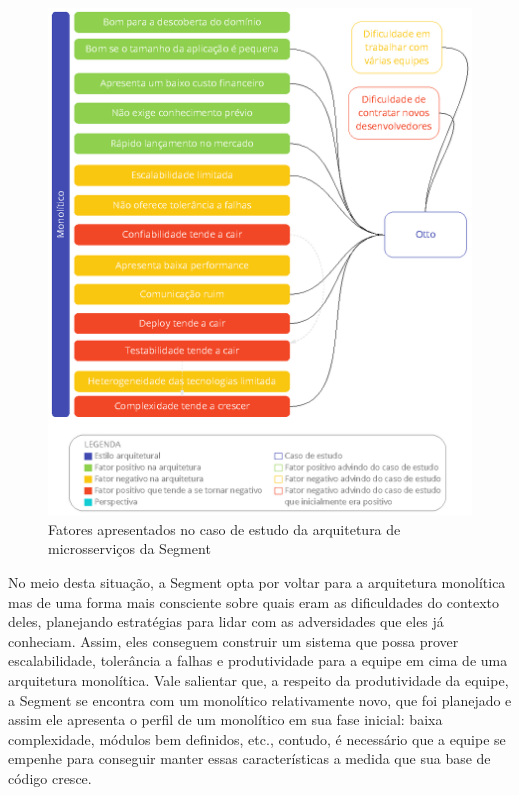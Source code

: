 \begin{figure}[h]
  \centering
  \includegraphics[keepaspectratio=true,scale=1]{figuras/monoOtto.eps}
  \caption{Fatores apresentados no caso de estudo da arquitetura de microsserviços da Segment\label{fig:analise-micro-segment}}
\end{figure}

No meio desta situação, a Segment opta por voltar para a arquitetura monolítica mas de uma forma
mais consciente sobre quais eram as dificuldades do contexto deles, planejando estratégias para
lidar com as adversidades que eles já conheciam. Assim, eles conseguem construir um sistema que
possa prover escalabilidade, tolerância a falhas e produtividade para a equipe em cima de uma
arquitetura monolítica. Vale salientar que, a respeito da produtividade da equipe, a Segment se
encontra com um monolítico relativamente novo, que foi planejado e assim ele apresenta o perfil de
um monolítico em sua fase inicial: baixa complexidade, módulos bem definidos, etc., contudo, é
necessário que a equipe se empenhe para conseguir manter essas características a medida que sua base
de código cresce.

